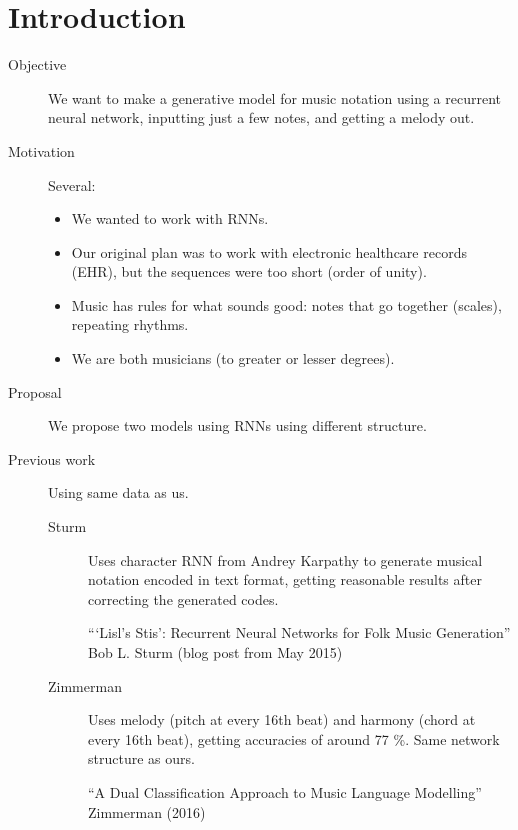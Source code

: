 \section{Introduction}
\label{sec:introduction}

\begin{description}
	\item[Objective] We want to make a generative model for music notation using a recurrent neural network, inputting just a few notes, and getting a melody out.
	
	\item[Motivation] Several:
	
	\begin{itemize}
		\item We wanted to work with RNNs.
		
		\item Our original plan was to work with electronic healthcare records (EHR), but the sequences were too short (order of unity).
		
		\item Music has rules for what sounds good: notes that go together (scales), repeating rhythms.
		
		\item We are both musicians (to greater or lesser degrees).
	\end{itemize}
	
	\item[Proposal] We propose two models using RNNs using different structure.
	
	\item[Previous work] Using same data as us.
	
	\begin{description}
		\item[Sturm] Uses character RNN from Andrey Karpathy to generate musical notation encoded in text format, getting reasonable results after correcting the generated codes.
		
		```Lisl's Stis': Recurrent Neural Networks for Folk Music Generation''
		Bob L. Sturm (blog post from May 2015)
		
		\item[Zimmerman] Uses melody (pitch at every 16th beat) and harmony (chord at every 16th beat), getting accuracies of around 77 \%. Same network structure as ours.
		
		``A Dual Classification Approach to Music Language Modelling''
		Zimmerman (2016)
	\end{description}
\end{description}

